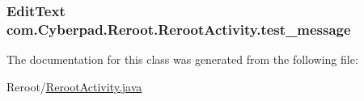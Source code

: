 \label{classcom_1_1_cyberpad_1_1_reroot_1_1_reroot_activity_a7588d6075e49fa48846a460f87c29d0c}
\hypertarget{classcom_1_1_cyberpad_1_1_reroot_1_1_reroot_activity_a467adf801369ca5593617c80e73efd4f}{
\subsubsection[{test\-\_\-message}]{\setlength{\rightskip}{0pt plus 5cm}\-Edit\-Text {\bf com.\-Cyberpad.\-Reroot.\-Reroot\-Activity.\-test\-\_\-message}}}
\label{classcom_1_1_cyberpad_1_1_reroot_1_1_reroot_activity_a467adf801369ca5593617c80e73efd4f}


\-The documentation for this class was generated from the following file\-:\begin{DoxyCompactItemize}
\item 
\-Reroot/\hyperlink{_reroot_activity_8java}{\-Reroot\-Activity.\-java}\end{DoxyCompactItemize}
